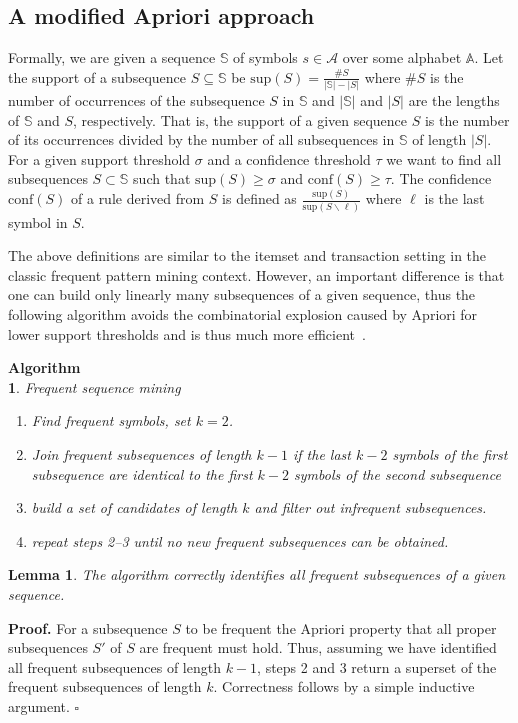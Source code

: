 \documentclass[10pt]{article}
\newtheorem{lemmx}{Lemma}
\newtheorem{algx}{Algorithm{\\}}
\begin{document}
\subsection{A modified Apriori approach}
Formally, we are given a sequence $\mathbb{S}$ of symbols $s \in \mathcal{A}$ over some
alphabet $\mathbb{A}$. Let the support of a subsequence $S \subseteq
\mathbb{S}$ be $\mbox{sup}(S) = \frac{\#S}{|\mathbb{S}| - |S|}$ where $\#S$ is
the number of occurrences of the subsequence $S$ in $\mathbb{S}$ and
$|\mathbb{S}|$ and $|S|$ are the lengths of $\mathbb{S}$ and $S$, respectively.
That is, the support of a given sequence $S$ is the number of its occurrences
divided by the number of all subsequences in $\mathbb{S}$ of length $|S|$.  For
a given support threshold $\sigma$ and a confidence threshold $\tau$ we want to
find all subsequences $S \subset \mathbb{S}$ such that $\mbox{sup}(S) \geq
\sigma$ and $\mbox{conf}(S) \geq \tau$. The confidence $\mbox{conf}(S)$ of a
rule derived from $S$ is defined as
$\frac{\mbox{sup}(S)}{\mbox{sup}(S\backslash\ell)}$ where $\ell$ is the last
symbol in $S$.

The above definitions are similar to the itemset and transaction
setting in the classic frequent pattern mining context. However, an important
difference is that one can build only linearly many subsequences of a given
sequence, thus the following algorithm avoids the combinatorial explosion
caused by Apriori for lower support thresholds and is thus much more
efficient~\cite{fpstock}. 
\begin{algx} {Frequent sequence mining}
    \vspace{-5pt}
\begin{enumerate}
\setlength{\itemsep}{1pt}
\setlength{\parskip}{0pt}
\setlength{\parsep}{0pt}
\item Find frequent symbols, set $k=2$.
\item Join frequent subsequences of length $k-1$ if the last $k-2$ symbols of the first subsequence are identical to the first $k-2$ symbols of the second subsequence
\item build a set of candidates of length $k$ and filter out infrequent subsequences.
\item repeat steps 2--3 until no new frequent subsequences can be obtained.
\end{enumerate}
\end{algx}
\vspace{-6pt}
\begin{lemmx}
The algorithm correctly identifies all frequent subsequences of a given sequence.
\end{lemmx}
\textbf{Proof.} For a subsequence $S$ to be frequent the Apriori property that
all proper subsequences $S'$ of $S$ are frequent must hold. Thus, assuming we
have identified all frequent subsequences of length $k-1$, steps 2 and 3 return
a superset of the frequent subsequences of length $k$. Correctness follows by a
simple inductive argument. $\square$
\end{document}
